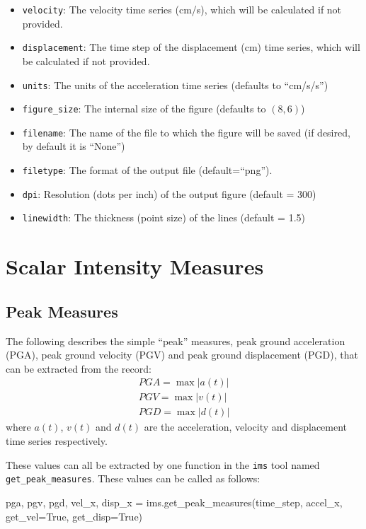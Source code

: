 \begin{itemize}
\item \verb=velocity=: The velocity time series (cm/s), which will be calculated if not provided.
\item \verb=displacement=: The time step of the displacement (cm) time series, which will be calculated if not provided.
\item \verb=units=: The units of the acceleration time series (defaults to ``cm/s/s'')
\item \verb=figure_size=: The internal size of the figure (defaults to $(8, 6)$)
\item \verb=filename=: The name of the file to which the figure will be saved (if desired, by default it is ``None'')
\item \verb=filetype=: The format of the output file (default=``png'').
\item \verb=dpi=: Resolution (dots per inch) of the output figure (default = 300)
\item \verb=linewidth=: The thickness (point size) of the lines (default = 1.5)
\end{itemize}


\section{Scalar Intensity Measures}
\label{sec:scalar_ims}

\subsection{Peak Measures}

The following describes the simple ``peak'' measures, peak ground acceleration (PGA), peak ground velocity (PGV) and peak ground displacement (PGD), that can be extracted from the record:
\begin{align}
PGA = \max |a \left( t \right)| \nonumber\\
PGV = \max |v \left( t \right)| \\
PGD = \max |d \left( t \right)| \nonumber
\end{align}
where $a \left( t \right)$, $v \left( t \right)$ and $d \left( t \right)$ are the acceleration, velocity and displacement time series respectively.

These values can all be extracted by one function in the \verb=ims= tool named \verb=get_peak_measures=. These values can be called as follows:

\begin{python}[frame=single]
pga, pgv, pgd, vel_x, disp_x = ims.get_peak_measures(time_step,
                                                     accel_x,
                                                     get_vel=True,
                                                     get_disp=True)
\end{python}

